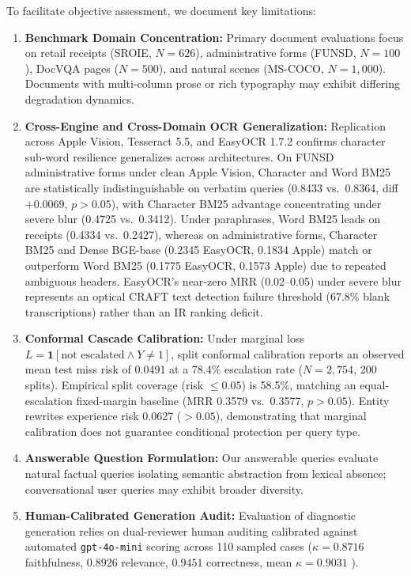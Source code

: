 To facilitate objective assessment, we document key limitations:
\begin{enumerate}
    \setlength{\itemsep}{0.2pt plus 0.1pt}
    \setlength{\parskip}{0pt}
    \item \textbf{Benchmark Domain Concentration:} Primary document evaluations focus on retail receipts (SROIE, $N=626$), administrative forms (FUNSD, $N=100$), DocVQA pages ($N=500$), and natural scenes (MS-COCO, $N=1{,}000$). Documents with multi-column prose or rich typography may exhibit differing degradation dynamics.
    \item \textbf{Cross-Engine and Cross-Domain OCR Generalization:} Replication across Apple Vision, Tesseract 5.5, and EasyOCR 1.7.2 confirms character sub-word resilience generalizes across architectures. On FUNSD administrative forms under clean Apple Vision, Character and Word BM25 are statistically indistinguishable on verbatim queries (0.8433 vs.\ 0.8364, diff $+0.0069$, $p > 0.05$), with Character BM25 advantage concentrating under severe blur (0.4725 vs.\ 0.3412). Under paraphrases, Word BM25 leads on receipts (0.4334 vs.\ 0.2427), whereas on administrative forms, Character BM25 and Dense BGE-base (0.2345 EasyOCR, 0.1834 Apple) match or outperform Word BM25 (0.1775 EasyOCR, 0.1573 Apple) due to repeated ambiguous headers. EasyOCR's near-zero MRR (0.02--0.05) under severe blur represents an optical CRAFT text detection failure threshold (67.8\% blank transcriptions) rather than an IR ranking deficit.
    \item \textbf{Conformal Cascade Calibration:} Under marginal loss $L = \mathbf{1}[\text{not escalated} \land Y \ne 1]$, split conformal calibration reports an observed mean test miss risk of 0.0491 at a 78.4\% escalation rate ($N=2{,}754$, 200 splits). Empirical split coverage (risk $\le 0.05$) is 58.5\%, matching an equal-escalation fixed-margin baseline (MRR 0.3579 vs.\ 0.3577, $p > 0.05$). Entity rewrites experience risk 0.0627 ($> 0.05$), demonstrating that marginal calibration does not guarantee conditional protection per query type.
    \item \textbf{Answerable Question Formulation:} Our answerable queries evaluate natural factual queries isolating semantic abstraction from lexical absence; conversational user queries may exhibit broader diversity.
    \item \textbf{Human-Calibrated Generation Audit:} Evaluation of diagnostic generation relies on dual-reviewer human auditing calibrated against automated \texttt{gpt-4o-mini} scoring across 110 sampled cases ($\kappa = 0.8716$ faithfulness, $0.8926$ relevance, $0.9451$ correctness, mean $\kappa = 0.9031$ \cite{zheng2023judging}).

\end{enumerate}
